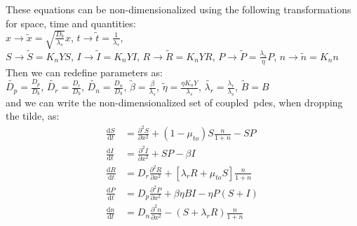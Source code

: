 These equations can be non-dimensionalized using the following transformations for space, time and quantities:\\
$x \rightarrow \tilde{x} = \sqrt{\frac{D_b}{\lambda_s}} x$, $t \rightarrow \tilde{t} = \frac{1}{\lambda_s}$, \\
$S \rightarrow \tilde{S} = K_n Y S$, $I \rightarrow \tilde{I} = K_n Y I$, $R \rightarrow \tilde{R} = K_n Y R$, $P \rightarrow \tilde{P} = \frac{\lambda_s}{\eta} P$, $n \rightarrow \tilde{n} = K_n n$\\
Then we can redefine parameters as:\\
$\tilde{D_p} = \frac{D_p}{D_b}$, $\tilde{D_r} = \frac{D_r}{D_b}$, $\tilde{D_n} = \frac{D_n}{D_b}$, $\tilde{\beta} = \frac{\beta}{\lambda_s}$, $\tilde{\eta} = \frac{\eta K_n Y}{\lambda_s}$, $\tilde{\lambda_r} = \frac{\lambda_r}{\lambda_s}$, $\tilde{B} = B$\\
and we can write the non-dimensionalized set of coupled~\gls{pde}s, when dropping the tilde, as:
\begin{align}
    \frac{\text{d}S}{\text{d}t} &= \frac{\partial^2S}{\partial x^2} + \left( 1 - \mu_{to} \right) S \frac{n}{1+n}  - SP \\
    \frac{\text{d}I}{\text{d}t} &= \frac{\partial^2I}{\partial x^2} + SP - \beta I\\
    \frac{\text{d}R}{\text{d}t} &= D_r \frac{\partial^2R}{\partial x^2} + \left[\lambda_r R + \mu_{to} S \right] \frac{n}{1+n}\\
    \frac{\text{d}P}{\text{d}t} &= D_p \frac{\partial^2P}{\partial x^2} + \beta \eta BI - \eta P(S+I) \\
    \frac{\text{d}n}{\text{d}t} &= D_n \frac{\partial^2n}{\partial x^2} - \left( S + \lambda_r R \right) \frac{n}{1+n}
\end{align}
